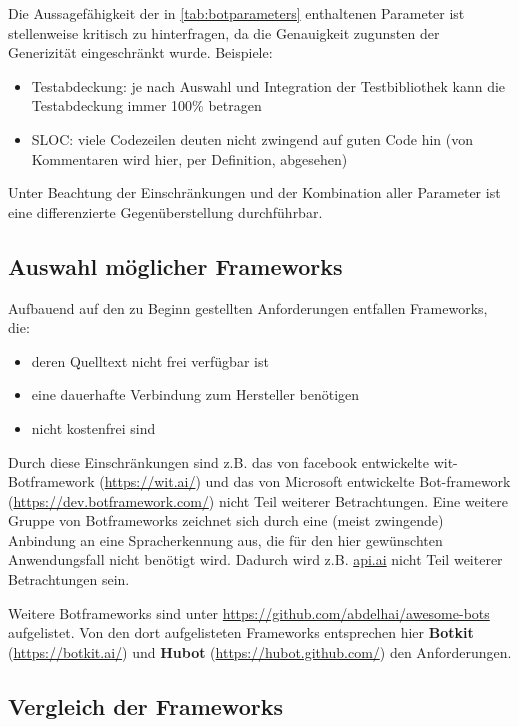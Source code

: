 Die Aussagefähigkeit der in \autoref{tab:botparameters} enthaltenen Parameter ist stellenweise kritisch zu hinterfragen, da die Genauigkeit zugunsten der Generizität eingeschränkt wurde. 
Beispiele:
\begin{itemize}
    \item Testabdeckung: je nach Auswahl und Integration der Testbibliothek kann die Testabdeckung immer 100\% betragen
\item SLOC: viele Codezeilen deuten nicht zwingend auf guten Code hin (von Kommentaren wird hier, per Definition, abgesehen)
\end{itemize}

Unter Beachtung der Einschränkungen und der Kombination aller Parameter ist eine differenzierte Gegenüberstellung durchführbar.

\subsection{Auswahl möglicher Frameworks}

Aufbauend auf den zu Beginn gestellten Anforderungen entfallen Frameworks, die:
\begin{itemize}
    \item deren Quelltext nicht frei verfügbar ist
    \item eine dauerhafte Verbindung zum Hersteller benötigen
    \item nicht kostenfrei sind
\end{itemize}

Durch diese Einschränkungen sind z.B. das von facebook entwickelte wit-Botframework (\url{https://wit.ai/}) und das von Microsoft entwickelte Bot-framework (\url{https://dev.botframework.com/}) nicht Teil weiterer Betrachtungen.
Eine weitere Gruppe von Botframeworks zeichnet sich durch eine (meist zwingende) Anbindung an eine Spracherkennung aus, die für den hier gewünschten Anwendungsfall nicht benötigt wird. Dadurch wird z.B. \url{api.ai} nicht Teil weiterer Betrachtungen sein.


Weitere Botframeworks sind unter \url{https://github.com/abdelhai/awesome-bots} aufgelistet. 
Von den dort aufgelisteten Frameworks entsprechen hier \textbf{Botkit} (\url{https://botkit.ai/}) und \textbf{Hubot} (\url{https://hubot.github.com/}) den Anforderungen.

\subsection{Vergleich der Frameworks}

